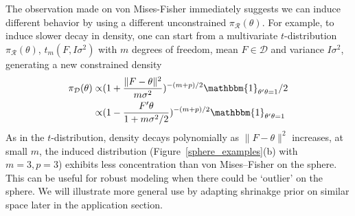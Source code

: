 \documentclass[10pt,fleqn]{article}
\newcommand{\be}{\begin{equation}\begin{aligned}}
\newcommand{\ee}{\end{aligned}\end{equation}}
\newcommand{\mc}[1]{\mathcal{#1}}
\DeclareMathOperator{\No}{No}
\DeclareMathOperator{\1}{\mathbbm{1}}
\begin{document}
The observation made on von Mises-Fisher immediately suggests we can induce different behavior by using a different unconstrained $\pi_{\mc R}(\theta)$.
% 
For example, to induce slower decay in density, one can start from a
multivariate $t$-distribution $\pi_{\mc
R}(\theta)$, $t_m(F,I\sigma^2)$ with $m$ degrees of freedom,
mean $F\in \mc D$ and variance $I\sigma^2$, generating a new constrained density 
\be
\pi_{\mc
D}(\theta)
\propto &
(1+\frac{\|F-\theta\|^2}{m\sigma^2})^{-{(m+p)}/{2}}\mathbbm{1}_{\theta'\theta=1}/2\\
\propto &
(1-\frac{F'\theta}{1+m\sigma^2/2})^{-{(m+p)}/{2}}\mathbbm{1}_{\theta'\theta=1}
\ee
As in the $t$-distribution, density decays polynomially as $\|F-\theta\|^2$ increases, at small
$m$, the induced distribution (Figure~\ref{sphere_examples}(b) with $m=3,p=3$) exhibits less concentration than von
Mises--Fisher on the sphere. This can be useful for robust modeling when
there could be `outlier' on the sphere.
We will illustrate more general use by adapting shrinakge prior on similar space later
in the application section. 
\end{document}
